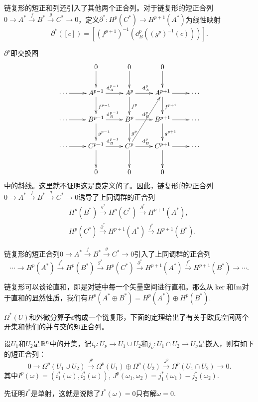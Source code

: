 \para 链复形的短正和列还引入了其他两个正合列。对于链复形的短正合列$
0\to A^*\xrightarrow{f}B^*\xrightarrow{g}C^*\to 0$，定义$\partial^*:H^p(C^*)\to H^{p+1}(A^*)$为线性映射
\[
	\partial^*([c])=\left[(f^{p+1})^{-1}\left(\dd^p_B\left((g^p)^{-1}(c)\right)\right)\right].
\]

$\partial^p$即交换图
	\[
		\xymatrix{
			&0\ar[d]&0\ar[d]&0\ar[d]&\\
			\cdots\ar[r]&A^{p-1}\ar[r]^{\dd_A^{p-1}}\ar[d]^{f^{p-1}}&A^p\ar[r]^{\dd_A^p}\ar[d]^{f^{p}}&A^{p+1}\ar[r]\ar[d]^{f^{p+1}}&\cdots\\
			\cdots\ar[r]&B^{p-1}\ar[r]^{\dd_B^{p-1}}\ar[d]^{g^{p-1}}&B^p\ar[r]^{\dd_B^p}\ar[d]^{g^{p}}&B^{p+1}\ar[r]\ar[d]^{g^{p+1}}&\cdots\\
			\cdots\ar[r]&C^{p-1}\ar[r]^{\dd_B^{p-1}}\ar[d]&C^p\ar[r]^{\dd_B^p}\ar[d]\ar[ruu]&C^{p+1}\ar[r]\ar[d]&\cdots\\
			&0&0&0&
		}
	\]
中的斜线。这里就不证明这是良定义的了。因此，链复形的短正合列$0\to A^*\xrightarrow{f}B^*\xrightarrow{g}C^*\to 0$诱导了上同调群的正合列
\[
\begin{split}
&H^p(B^*)\xrightarrow{g^*}H^p(C^*)\xrightarrow{\partial^*}H^{p+1}(A^*),\\
&H^p(C^*)\xrightarrow{\partial^*}H^{p+1}(A^*)\xrightarrow{f^*}H^{p+1}(B^*).
\end{split}
\]

\theo \label{longexact}
链复形的短正合列$0\to A^*\xrightarrow{f}B^*\xrightarrow{g}C^*\to 0$引入了上同调群的正合列
\[
\cdots\to H^p(A^*)\xrightarrow{f^*}H^p(B^*)\xrightarrow{g^*}H^p(C^*)\xrightarrow{\partial^*}H^{p+1}(A^*)\xrightarrow{f^*}H^{p+1}(B^*)\to\cdots.
\]

\para \label{directsum} 链复形可以谈论直和，即是对链中每一个矢量空间进行直和。那么从$\ker$和$\mathrm{Im}$对于直和的显然性质，我们有$H^p(A^*\oplus B^*)=H^p(A^*)\oplus H^p(B^*)$.

$\Omega^*(U)$和外微分算子$\dd$构成一个链复形，下面的定理给出了有关于欧氏空间两个开集和他们的并与交的短正合列。

\theo 设$U_1$和$U_2$是$\mathbb{R}^n$中的开集，记$i_\nu:U_\nu \to U_1 \cup U_2$和$j_\nu:U_1\cap U_2 \to U_\nu$是嵌入，则有如下的短正合列：
\[
0\to \Omega^p(U_1\cup U_2)\xrightarrow{I^p}\Omega^p(U_1)\oplus\Omega^p(U_2)\xrightarrow{J^p}\Omega^p(U_1\cap U_2)\to 0.
\]
其中$I^p(\omega)=(i_1^*(\omega),i_2^*(\omega))$, $J^p(\omega_1,\omega_2)=j_1^*(\omega_1)-j_2^*(\omega_2)$.

\proof 先证明$I^*$是单射，这就是说除了$I^*(\omega)=0$只有解$\omega=0$.

